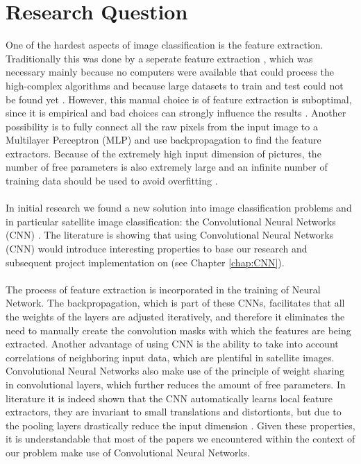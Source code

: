 \documentclass[a4paper,onecolumn]{report}
\begin{document}
\chapter{Research Question}
\label{chap:researchquestion}
One of the hardest aspects of image classification is the feature extraction. Traditionally this was done by a seperate feature extraction \cite{duda1973pattern}, which was necessary mainly because no computers were available that could process the high-complex algorithms and because large datasets to train and test could not be found yet \cite{lecun1998gradient}. However, this manual choice is of feature extraction is suboptimal, since it is empirical and bad choices can strongly influence the results \cite{duffner2008face}. 
Another possibility is to fully connect all the raw pixels from the input image to a Multilayer Perceptron (MLP) and use backpropagation to find the feature extractors. Because of the extremely high input dimension of pictures, the number of free parameters is also extremely large and an infinite number of training data should be used to avoid overfitting \cite{hawkins2004problem}.
\\\\
In initial research we found a new solution into image classification problems and in particular satellite image classification: the Convolutional Neural Networks (CNN) \cite{Hongsheng2014} \cite{Farabet2013}. The literature is showing that using Convolutional Neural Networks (CNN) would introduce interesting properties to base our research and subsequent project implementation on (see Chapter \ref{chap:CNN}).
\\\\
The process of feature extraction is incorporated in the training of Neural Network. The backpropagation, which is part of these CNNs, facilitates that all the weights of the layers are adjusted iteratively, and therefore it eliminates the need to manually create the convolution masks with which the features are being extracted. Another advantage of using CNN is the ability to take into account correlations of neighboring input data, which are plentiful in satellite images. Convolutional Neural Networks also make use of the principle of weight sharing in convolutional layers, which further reduces the amount of free parameters. In literature it is indeed shown that the CNN automatically learns local feature extractors, they are invariant to small translations and distortionts, but due to the pooling layers drastically reduce the input dimension \cite{duffner2008face}. Given these properties, it is understandable that most of the papers we encountered within the context of our problem make use of Convolutional Neural Networks.
\end{document}
